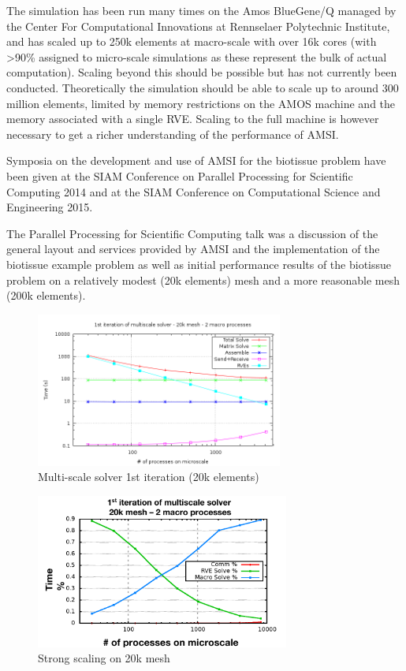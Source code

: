 The simulation has been run many times on the Amos BlueGene/Q managed by the Center For Computational Innovations at Rennselaer Polytechnic Institute, and has scaled up to 250k elements at macro-scale with over 16k cores (with >90\% assigned to micro-scale simulations as these represent the bulk of actual computation). Scaling beyond this should be possible but has not currently been conducted. Theoretically the simulation should be able to scale up to around 300 million elements, limited by memory restrictions on the AMOS machine and the memory associated with a single RVE. Scaling to the full machine is however necessary to get a richer understanding of the performance of AMSI.

Symposia on the development and use of AMSI for the biotissue problem have been given at the SIAM Conference on Parallel Processing for Scientific Computing 2014 and at the SIAM Conference on Computational Science and Engineering 2015.

The Parallel Processing for Scientific Computing talk \cite{wtobin2014pp} was a discussion of the general layout and services provided by AMSI and the implementation of the biotissue example problem as well as initial performance results of the biotissue problem on a relatively modest (20k elements) mesh and a more reasonable mesh (200k elements).

\begin{figure}
  \begin{center}
    \includegraphics[height=2in]{allTimes_2macro_20k.png}
  \end{center}
  \caption{\small Multi-scale solver 1st iteration (20k elements)}
  \label{20k_first_iteration}
\end{figure}

\begin{figure}
  \begin{center}
    \includegraphics[height=2in]{siam_pp_weak_scaling.png}
  \end{center}
  \caption{\small Strong scaling on 20k mesh}
  \label{strong_scaling}
\end{figure}

